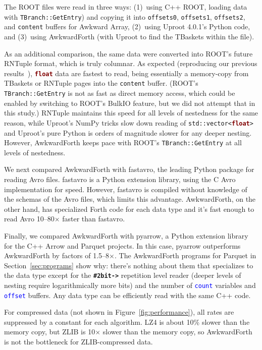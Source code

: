 \documentclass{webofc}
\begin{document}
The ROOT files were read in three ways: (1)~using C++ ROOT, loading data with {\tt TBranch::GetEntry}) and copying it into {\tt offsets0}, {\tt offsets1}, {\tt offsets2}, and {\tt content} buffers for Awkward Array, (2)~using Uproot 4.0.1's Python code, and (3)~using AwkwardForth (with Uproot to find the TBaskets within the file).

As an additional comparison, the same data were converted into ROOT's future RNTuple format, which is truly columnar. As expected (reproducing our previous results~\cite{chep2019}), \textcolor{Maroon}{\tt\textbf{float}} data are fastest to read, being essentially a memory-copy from TBaskets or RNTuple pages into the {\tt content} buffer. (ROOT's {\tt TBranch::GetEntry} is not as fast as direct memory access, which could be enabled by switching to ROOT's BulkIO feature, but we did not attempt that in this study.) RNTuple maintains this speed for all levels of nestedness for the same reason, while Uproot's NumPy tricks slow down reading of {\tt std::vector<\textcolor{Maroon}{\textbf{float}}>} and Uproot's pure Python is orders of magnitude slower for any deeper nesting. However, AwkwardForth keeps pace with ROOT's {\tt TBranch::GetEntry} at all levels of nestedness.

We next compared AwkwardForth with fastavro, the leading Python package for reading Avro files. fastavro is a Python extension library, using the C Avro implementation for speed. However, fastavro is compiled without knowledge of the schemas of the Avro files, which limits this advantage. AwkwardForth, on the other hand, has specialized Forth code for each data type and it's fast enough to read Avro 10--80$\times$ faster than fastavro.

Finally, we compared AwkwardForth with pyarrow, a Python extension library for the C++ Arrow and Parquet projects. In this case, pyarrow outperforms AwkwardForth by factors of 1.5--8$\times$. The AwkwardForth programs for Parquet in Section~\ref{sec:programs} show why: there's nothing about them that specializes to the data type except for the \textcolor{OliveGreen}{\tt\textbf{\#2bit->}} repetition level reader (deeper levels of nesting require logarithmically more bits) and the number of \textcolor{blue}{\tt count} variables and \textcolor{blue}{\tt offset} buffers. Any data type can be efficiently read with the same C++ code.

For compressed data (not shown in Figure~\ref{fig:performance}), all rates are suppressed by a constant for each algorithm. LZ4 is about 10\% slower than the memory copy, but ZLIB is 10$\times$ slower than the memory copy, so AwkwardForth is not the bottleneck for ZLIB-compressed data.
\end{document}
